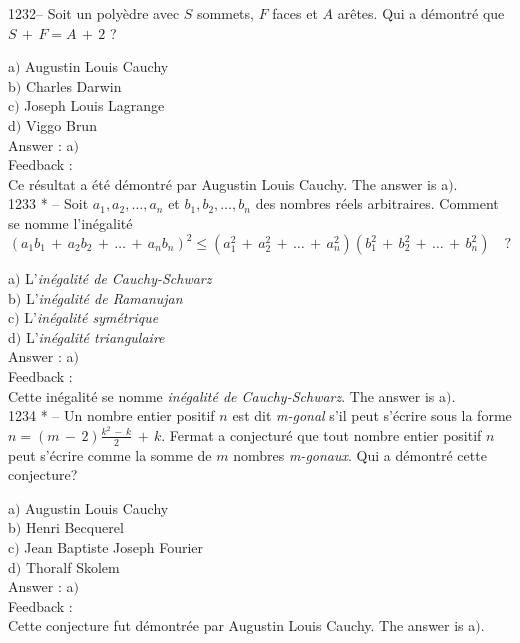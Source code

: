 ﻿\documentclass[letterpaper, 12pt]{article}
\begin{document}
1232-- Soit un poly\`edre avec $S$ sommets, $F$ faces et $A$
ar\^etes. Qui a d\'emontr\'e que $S\,+\,F=A\,+\,2$ ?

a$)$ Augustin Louis Cauchy \\
b$)$ Charles Darwin \\
c$)$ Joseph Louis Lagrange \\
d$)$ Viggo Brun\\

Answer : a$)$\\

Feedback : \\
Ce r\'esultat a \'et\'e d\'emontr\'e par Augustin Louis Cauchy.
The answer is a$)$.\\

1233 * -- Soit $a_1,a_2,\ldots,a_n$ et $b_1,b_2,\ldots,b_n$ des nombres
r\'eels arbitraires. Comment se nomme l'in\'egalit\'e
$$(a_1b_1\,+\,a_2b_2\,+\,\ldots\,+\,a_nb_n)^2\le(a_1^2\,+\,a_2^2\,+\,\ldots\,+\,a_n^2)(b_1^2\,+\,b_2^2\,+\,\ldots\,+\,b_n^2)\quad?$$

a$)$ L'{\sl in\'egalit\'e de Cauchy-Schwarz} \\
b$)$ L'{\sl in\'egalit\'e de Ramanujan} \\
c$)$ L'{\sl in\'egalit\'e sym\'etrique} \\
d$)$ L'{\sl in\'egalit\'e triangulaire}\\

Answer : a$)$\\

Feedback : \\
Cette in\'egalit\'e se nomme {\sl in\'egalit\'e de Cauchy-Schwarz}.
The answer is a$)$.\\

1234 * -- Un nombre entier positif $n$ est dit {\sl m-gonal} s'il
peut s'\'ecrire sous la forme
$\displaystyle{n=(m\,-\,2)\frac{k^2\,-\,k}2\,+\,k}$. Fermat a
conjectur\'e que tout nombre entier positif $n$ peut s'\'ecrire
comme la somme de $m$ nombres {\sl m-gonaux}. Qui a d\'emontr\'e
cette conjecture?

a$)$ Augustin Louis Cauchy \\
b$)$ Henri Becquerel \\
c$)$ Jean Baptiste Joseph Fourier \\
d$)$ Thoralf Skolem\\

Answer : a$)$\\

Feedback : \\
Cette conjecture fut d\'emontr\'ee par Augustin Louis Cauchy.
The answer is a$)$.\\
\end{document}

